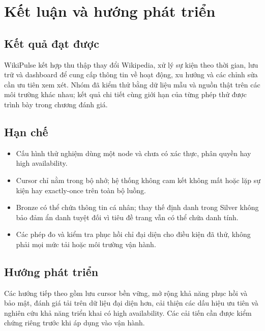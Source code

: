 \chapter{Kết luận và hướng phát triển}\label{chap:ketluan}
\section{Kết quả đạt được}
WikiPulse kết hợp thu thập thay đổi Wikipedia, xử lý sự kiện theo thời gian, lưu trữ và dashboard để cung cấp thông tin về hoạt động, xu hướng và các chỉnh sửa cần ưu tiên xem xét. Nhóm đã kiểm thử bằng dữ liệu mẫu và nguồn thật trên các môi trường khác nhau; kết quả chi tiết cùng giới hạn của từng phép thử được trình bày trong chương đánh giá.
\section{Hạn chế}
\begin{itemize}
\setlength{\itemsep}{0pt}
\item Cấu hình thử nghiệm dùng một node và chưa có xác thực, phân quyền hay high availability.
\item Cursor chỉ nằm trong bộ nhớ; hệ thống không cam kết không mất hoặc lặp sự kiện hay exactly-once trên toàn bộ luồng.
\item Bronze có thể chứa thông tin cá nhân; thay thế định danh trong Silver không bảo đảm ẩn danh tuyệt đối vì tiêu đề trang vẫn có thể chứa danh tính.
\item Các phép đo và kiểm tra phục hồi chỉ đại diện cho điều kiện đã thử, không phải mọi mức tải hoặc môi trường vận hành.
\end{itemize}
\section{Hướng phát triển}
Các hướng tiếp theo gồm lưu cursor bền vững, mở rộng khả năng phục hồi và bảo mật, đánh giá tải trên dữ liệu đại diện hơn, cải thiện các dấu hiệu ưu tiên và nghiên cứu khả năng triển khai có high availability. Các cải tiến cần được kiểm chứng riêng trước khi áp dụng vào vận hành.
